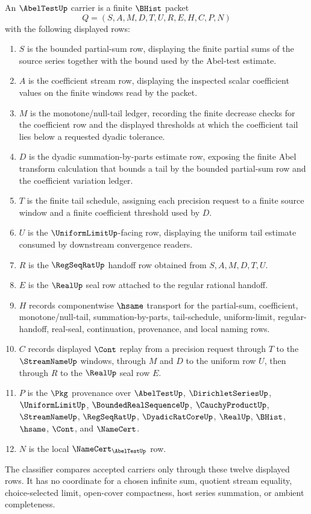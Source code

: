 \begin{definition}
\label{def:abel-test-carrier}
An $\AbelTestUp$ carrier is a finite $\BHist$ packet
$$
Q=(S,A,M,D,T,U,R,E,H,C,P,N)
$$
with the following displayed rows:
\begin{enumerate}
\item $S$ is the bounded partial-sum row, displaying the finite partial sums of the source series together with the bound used by the Abel-test estimate.
\item $A$ is the coefficient stream row, displaying the inspected scalar coefficient values on the finite windows read by the packet.
\item $M$ is the monotone/null-tail ledger, recording the finite decrease checks for the coefficient row and the displayed thresholds at which the coefficient tail lies below a requested dyadic tolerance.
\item $D$ is the dyadic summation-by-parts estimate row, exposing the finite Abel transform calculation that bounds a tail by the bounded partial-sum row and the coefficient variation ledger.
\item $T$ is the finite tail schedule, assigning each precision request to a finite source window and a finite coefficient threshold used by $D$.
\item $U$ is the $\UniformLimitUp$-facing row, displaying the uniform tail estimate consumed by downstream convergence readers.
\item $R$ is the $\RegSeqRatUp$ handoff row obtained from $S,A,M,D,T,U$.
\item $E$ is the $\RealUp$ seal row attached to the regular rational handoff.
\item $H$ records componentwise $\hsame$ transport for the partial-sum, coefficient, monotone/null-tail, summation-by-parts, tail-schedule, uniform-limit, regular-handoff, real-seal, continuation, provenance, and local naming rows.
\item $C$ records displayed $\Cont$ replay from a precision request through $T$ to the $\StreamNameUp$ windows, through $M$ and $D$ to the uniform row $U$, then through $R$ to the $\RealUp$ seal row $E$.
\item $P$ is the $\Pkg$ provenance over $\AbelTestUp$, $\DirichletSeriesUp$, $\UniformLimitUp$, $\BoundedRealSequenceUp$, $\CauchyProductUp$, $\StreamNameUp$, $\RegSeqRatUp$, $\DyadicRatCoreUp$, $\RealUp$, $\BHist$, $\hsame$, $\Cont$, and $\NameCert$.
\item $N$ is the local $\NameCert_{\AbelTestUp}$ row.
\end{enumerate}
The classifier compares accepted carriers only through these twelve displayed rows. It has no coordinate for a chosen infinite sum, quotient stream equality, choice-selected limit, open-cover compactness, host series summation, or ambient completeness.
\end{definition}

